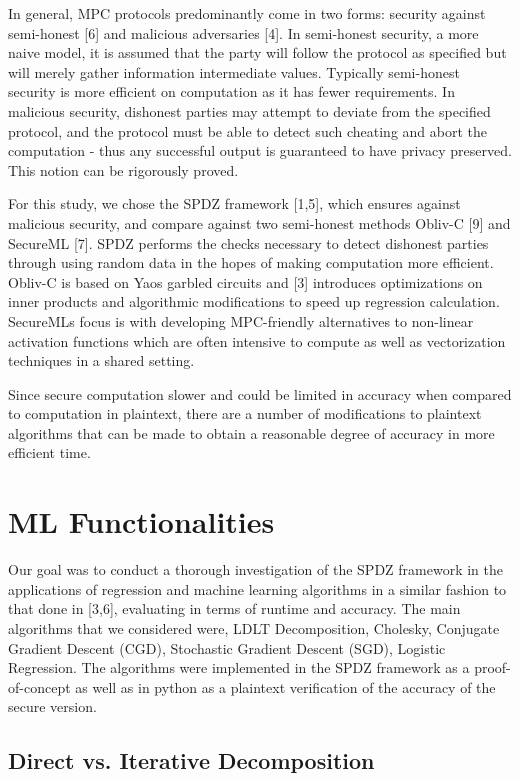 \documentclass{article}
\begin{document}
In general, MPC protocols predominantly come in two forms: security against semi-honest [6] and malicious adversaries [4]. In semi-honest security, a more naive model, it is assumed that the party will follow the protocol as specified but will merely gather information intermediate values. Typically semi-honest security is more efficient on computation as it has fewer requirements. In malicious security, dishonest parties may attempt to deviate from the specified protocol, and the protocol must be able to detect such cheating and abort the computation - thus any successful output is guaranteed to have privacy preserved. This notion can be rigorously proved.

For this study, we chose the SPDZ framework [1,5], which ensures against malicious security, and compare against two semi-honest methods Obliv-C [9] and SecureML [7]. SPDZ performs the checks necessary to detect dishonest parties through using random data in the hopes of making computation more efficient. Obliv-C is based on Yao\textquotesingle s garbled circuits and [3] introduces optimizations on inner products and algorithmic modifications to speed up regression calculation. SecureML\textquotesingle s focus is with developing MPC-friendly alternatives to non-linear activation functions which are often intensive to compute as well as vectorization techniques in a shared setting. 

Since secure computation slower and could be limited in accuracy when compared to computation in plaintext, there are a number of modifications to plaintext algorithms that can be made to obtain a reasonable degree of accuracy in more efficient time.

\section{ML Functionalities}

Our goal was to conduct a thorough investigation of the SPDZ framework in the applications of regression and machine learning algorithms in a similar fashion to that done in  [3,6], evaluating in terms of runtime and accuracy. The main algorithms that we considered were, LDLT Decomposition, Cholesky, Conjugate Gradient Descent (CGD), Stochastic Gradient Descent (SGD), Logistic Regression. The algorithms were implemented in the SPDZ framework as a proof-of-concept as well as in python as a plaintext verification of the accuracy of the secure version.

\subsection{Direct vs. Iterative Decomposition}
\end{document}
